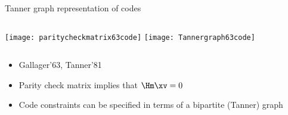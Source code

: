 \begin{frame}{Tanner graph representation of codes}
\begin{columns}
\texttt{[image: paritycheckmatrix63code]}
\texttt{[image: Tannergraph63code]}
\end{columns}
\begin{block}{}
\begin{itemize}
    \item Gallager'63, Tanner'81
    \item Parity check matrix implies that $\Hm \xv = 0$
    \item Code constraints can be specified in terms of a bipartite (Tanner) graph
\end{itemize}
\end{block}
\end{frame}
